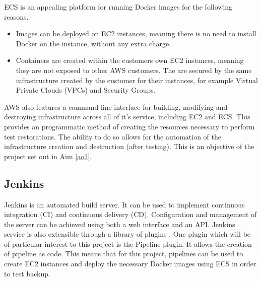 ECS is an appealing platform for running Docker images for the following reasons.
\begin{itemize}
	\item Images can be deployed on EC2 instances, meaning there is no need to install Docker on the instance, without any extra charge.
	\item Containers are created within the customers own EC2 instances, meaning they are not exposed to other AWS customers. The are secured by the same infrastructure created by the customer for their instances, for example Virtual Private Clouds (VPCs) and Security Groups.
\end{itemize}

AWS also features a  command line interface for building, modifying and destroying infrastructure across all of it's service, including EC2 and ECS. This provides an programmatic method of creating the resources necessary to perform test restorations. The ability to do so allows for the automation of the infrastructure creation and destruction (after testing). This is an objective of the project set out in Aim \ref{ao1}. 


\subsection{Jenkins}
Jenkins is an automated build server. It can be used to implement continuous integration (CI) and continuous delivery (CD). Configuration and management of the server can be achieved using both a web interface and an API. Jenkins service is also extensible through a library of plugins \citep{jenkins}. One plugin which will be of particular interest to this project is the Pipeline plugin. It allows the creation of pipeline as code. This means that for this project, pipelines can be used to create EC2 instances and deploy the necessary Docker images using ECS in order to test backup.
 
